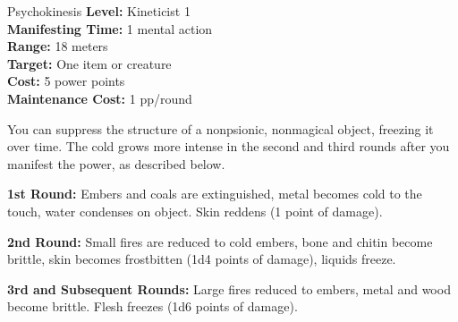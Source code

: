 {Psychokinesis}
{
    \textbf{Level:}
    Kineticist 1\\
    \textbf{Manifesting Time:}
    1 mental action\\
    \textbf{Range:}
    18 meters\\
    \textbf{Target:}
    One item or creature\\
    \textbf{Cost:}
    5 power points\\
    \textbf{Maintenance Cost:}
    1 pp/round\\
}
{
    You can suppress the structure of a nonpsionic, nonmagical object, freezing it over time. The cold grows more intense in the second and third rounds after you manifest the power, as described below.

    \textbf{1st Round:} Embers and coals are extinguished, metal becomes cold to the touch, water condenses on object. Skin reddens (1 point of damage).

    \textbf{2nd Round:} Small fires are reduced to cold embers, bone and chitin become brittle, skin becomes frostbitten (1d4 points of damage), liquids freeze.

    \textbf{3rd and Subsequent Rounds:} Large fires reduced to embers, metal and wood become brittle. Flesh freezes (1d6 points of damage).
}
